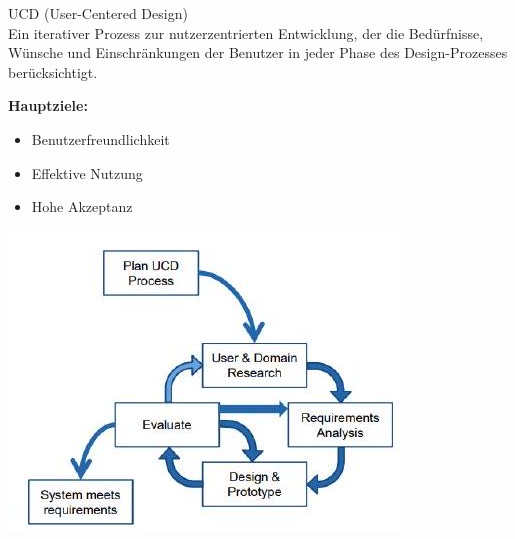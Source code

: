 \begin{concept}{UCD (User-Centered Design)}\\
Ein iterativer Prozess zur nutzerzentrierten Entwicklung, der die Bedürfnisse, Wünsche und Einschränkungen der Benutzer in jeder Phase des Design-Prozesses berücksichtigt.

\begin{minipage}{0.3\linewidth}
\textbf{Hauptziele:}
\begin{itemize}
    \item Benutzerfreundlichkeit
    \item Effektive Nutzung
    \item Hohe Akzeptanz
\end{itemize}
\end{minipage}
\begin{minipage}{0.65\linewidth}
    \includegraphics[width=\linewidth]{images/2024_12_29_0d1d7b5551ea1b4b41bdg-03}
\end{minipage}
\end{concept}

